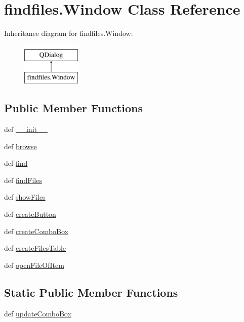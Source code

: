 \hypertarget{classfindfiles_1_1Window}{}\section{findfiles.\+Window Class Reference}
\label{classfindfiles_1_1Window}
Inheritance diagram for findfiles.\+Window\+:\begin{figure}[H]
\begin{center}
\leavevmode
\includegraphics[height=2.000000cm]{classfindfiles_1_1Window}
\end{center}
\end{figure}
\subsection*{Public Member Functions}
\begin{DoxyCompactItemize}
\item 
def \hyperlink{classfindfiles_1_1Window_af648c7f945c38e399362a51f0c1c0fe8}{\+\_\+\+\_\+init\+\_\+\+\_\+}
\item 
def \hyperlink{classfindfiles_1_1Window_a6eefd908a2ee87e7c86fc0f2a9ff386a}{browse}
\item 
def \hyperlink{classfindfiles_1_1Window_afe814f6757cd8f3e77816eb0b1a23bf3}{find}
\item 
def \hyperlink{classfindfiles_1_1Window_ad8333cd03b767b24eeea73d739dea96e}{find\+Files}
\item 
def \hyperlink{classfindfiles_1_1Window_a353c7322d9eb53396301c7e03d65d92f}{show\+Files}
\item 
def \hyperlink{classfindfiles_1_1Window_a254045726b07be719d60cecc7beaa47d}{create\+Button}
\item 
def \hyperlink{classfindfiles_1_1Window_ae968ae5e07957cb13ceef6553b27eb56}{create\+Combo\+Box}
\item 
def \hyperlink{classfindfiles_1_1Window_af85de578d19ca325338b877770a54845}{create\+Files\+Table}
\item 
def \hyperlink{classfindfiles_1_1Window_a118c74f355f58f0229cfd5d1a38ca4d5}{open\+File\+Of\+Item}
\end{DoxyCompactItemize}
\subsection*{Static Public Member Functions}
\begin{DoxyCompactItemize}
\item 
def \hyperlink{classfindfiles_1_1Window_a00fb42d7e504d7dc5426ebe3d449a099}{update\+Combo\+Box}
\end{DoxyCompactItemize}
